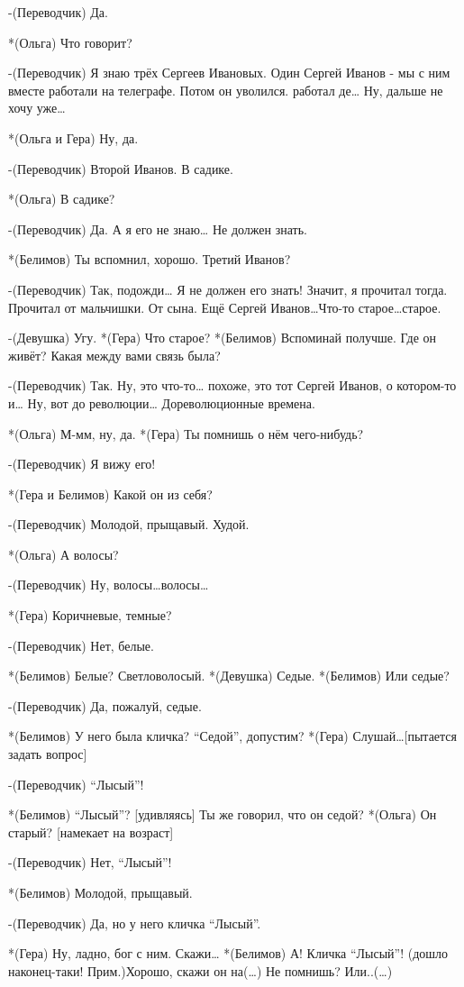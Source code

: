 -(Переводчик) Да.

*(Ольга) Что говорит?

-(Переводчик) Я знаю трёх Сергеев Ивановых. Один Сергей Иванов - мы с ним вместе работали на телеграфе. Потом он уволился. работал де… Ну, дальше не хочу уже…

*(Ольга и Гера) Ну, да.

-(Переводчик) Второй Иванов. В садике.

*(Ольга) В садике?

-(Переводчик) Да. А я его не знаю… Не должен знать.

*(Белимов) Ты вспомнил, хорошо. Третий Иванов?

-(Переводчик) Так, подожди… Я не должен его знать! Значит, я прочитал тогда. Прочитал от мальчишки. От сына.  Ещё Сергей Иванов…Что-то старое…старое. 

-(Девушка) Угу.
*(Гера) Что  старое?
*(Белимов) Вспоминай получше. Где он живёт? Какая между вами связь была?

-(Переводчик) Так. Ну, это что-то… похоже, это тот Сергей Иванов, о котором-то и… Ну, вот до революции… Дореволюционные времена. 

*(Ольга) М-мм, ну, да.
*(Гера) Ты помнишь о нём чего-нибудь?

-(Переводчик) Я вижу его!

*(Гера и Белимов) Какой он из себя?

-(Переводчик) Молодой, прыщавый. Худой.

*(Ольга) А волосы?

-(Переводчик) Ну, волосы…волосы… 

*(Гера) Коричневые, темные?


-(Переводчик) Нет, белые.

*(Белимов) Белые? Светловолосый.
*(Девушка) Седые.
*(Белимов) Или седые?

-(Переводчик) Да, пожалуй, седые.

*(Белимов) У него была кличка? “Седой”, допустим?
*(Гера) Слушай…[пытается задать вопрос]

-(Переводчик) “Лысый”!

*(Белимов) “Лысый”? [удивляясь] Ты же говорил, что он седой?
*(Ольга) Он старый? [намекает на возраст]

-(Переводчик) Нет, “Лысый”! 

*(Белимов) Молодой, прыщавый.

-(Переводчик) Да, но у него кличка “Лысый”.

*(Гера) Ну, ладно, бог с ним. Скажи…
*(Белимов) А! Кличка “Лысый”! (дошло наконец-таки! Прим.)Хорошо, скажи он на(…) Не помнишь?  Или..(…)

